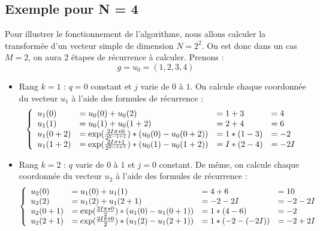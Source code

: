 \documentclass{report}
\begin{document}
		\subsection{Exemple pour N = 4}
		Pour illustrer le fonctionnement de l'algorithme, nous allons calculer la transformée d'un vecteur simple de dimension $N = 2^2$. On est donc dans un cas $M = 2$, on aura $2$ étapes de récurrence à calculer. Prenons :
		\[
			g = u_0 = (1, 2, 3, 4)
		\]
		\begin{itemize}
			\item Rang $k=1$ : $q = 0$ constant et $j$ varie de $0$ à $1$. On calcule chaque coordonnée du vecteur $u_1$ à l'aide des formules de récurrence :
			\[
			\left \{
			\begin{array}{l l l l}
				u_1(0) 		& = 	u_0(0) + u_0(2)
							& = 	1 + 3 
							& = 	4 \\

				u_1(1) 		& = 	u_0(1) + u_0(1+2)
							& = 	2 + 4 
							& = 	6 \\

				u_1(0+2) 	& = 	\exp(\frac{2I\pi*0}{2^{2-1+1}})*(u_0(0) - u_0(0+2))
							& = 	1*(1 - 3)
							& = 	-2 \\

				u_1(1+2) 	& = 	\exp(\frac{2I\pi*1}{2^{2-1+1}})*(u_0(1) - u_0(1+2))
							& = 	I * (2 - 4)
							& = 	-2I
			\end{array}
			\right .
			\]
			\item Rang $k=2$ : $q$ varie de $0$ à $1$ et $j = 0$ constant. De même, on calcule chaque coordonnée du vecteur $u_2$ à l'aide des formules de récurrence :
			\[
			\left \{
			\begin{array}{l l l l}
				u_2(0) 		& = 	u_1(0) + u_1(1)
							& = 	4 + 6 
							& = 	10 \\

				u_2(2) 		& = 	u_1(2) + u_1(2+1)
							& = 	-2 - 2I 
							& = 	-2 - 2I \\

				u_2(0+1) 	& = 	\exp(\frac{2I\pi*0}{2}) * (u_1(0) - u_1(0+1))
							& = 	1 * (4 - 6) 
							& = 	-2 \\

				u_2(2+1) 	& = 	\exp(\frac{2I\pi*0}{2}) * (u_1(2) - u_1(2+1))
							& = 	1 * (-2 - (-2I)) 
							& = 	-2 + 2I
			\end{array}
			\right .
			\]
		\end{itemize}
\end{document}
